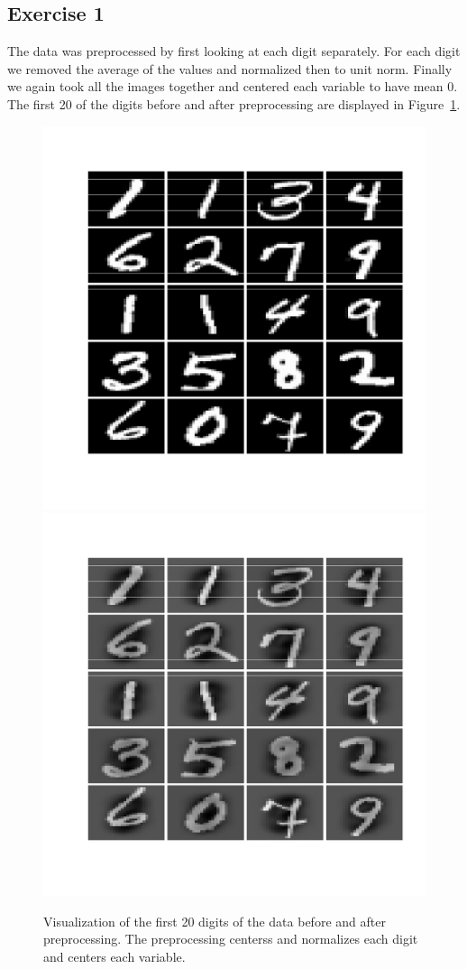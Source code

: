\documentclass{article}
\begin{document}
\subsection{Exercise 1}\label{sec:31}
The data was preprocessed by first looking at each digit separately.
For each digit we removed the average of the values and normalized then to unit norm.
Finally we again took all the images together and centered each variable to have mean 0.
The first 20 of the digits before and after preprocessing are displayed in Figure~\ref{fig:digits}.
\begin{figure}\centering
	\includegraphics[scale=0.4]{digits}
	\includegraphics[scale=0.4]{digitspre}
	\caption{Visualization of the first 20 digits of the data before and after preprocessing.
	The preprocessing centerss and normalizes each digit and centers each variable.}\label{fig:digits}
\end{figure}
\end{document}
